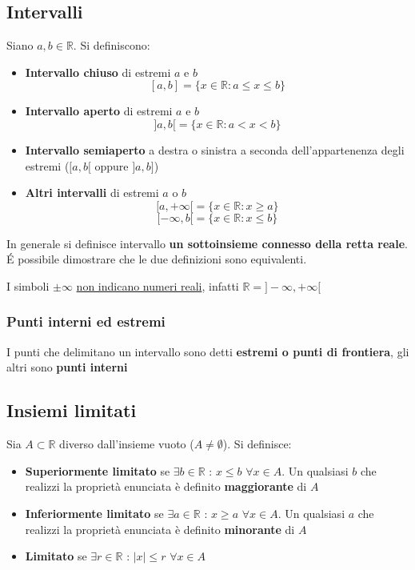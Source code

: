 \documentclass[10pt]{article}
\theoremstyle{plain}
\begin{document}
\subsection{Intervalli}
\begin{defin}
    Siano $a, b \in \mathbb{R}$. Si definiscono:
    \begin{itemize}[label = $\circ$]
        \item \textbf{Intervallo chiuso} di estremi $a$ e $b$
        \[[a,b] = \{x \in \mathbb{R} : a \leq x \leq b\}\]
        \item \textbf{Intervallo aperto} di estremi $a$ e $b$
        \[]a,b[ = \{x \in \mathbb{R} : a < x < b\}\]
        \item \textbf{Intervallo semiaperto} a destra o sinistra a seconda dell'appartenenza degli estremi ($[a,b[$ oppure $]a,b]$)
        \item \textbf{Altri intervalli} di estremi $a$ o $b$
        \[[a,+\infty[ = \{x \in \mathbb{R} : x \geq a\}\]
        \[[-\infty, b[ = \{x \in \mathbb{R} : x \leq b\}\]
    \end{itemize}
    In generale si definisce intervallo \textbf{un sottoinsieme connesso della retta reale}. \'E possibile dimostrare che le due definizioni sono equivalenti.
\end{defin}
\begin{oss}
    I simboli $\pm \infty$ \underline{non indicano numeri reali}, infatti $\mathbb{R} = ]-\infty, + \infty[$
\end{oss}

\subsubsection{Punti interni ed estremi}
\begin{defin}
    I punti che delimitano un intervallo sono detti \textbf{estremi o punti di frontiera}, gli altri sono \textbf{punti interni}
\end{defin}

\subsection{Insiemi limitati}
\begin{defin}
    Sia $A \subset \mathbb{R}$ diverso dall'insieme vuoto ($A \neq \emptyset$). Si definisce:
    \begin{itemize}
        \item \textbf{Superiormente limitato} se $\exists b \in \mathbb{R}$ : $x \leq b$ $\forall x \in A$. Un qualsiasi $b$ che realizzi la proprietà enunciata è definito \textbf{maggiorante} di $A$
        \item \textbf{Inferiormente limitato} se $\exists a \in \mathbb{R}$ : $x \geq a$ $\forall x \in A$. Un qualsiasi $a$ che realizzi la proprietà enunciata è definito \textbf{minorante} di $A$
        \item \textbf{Limitato} se $\exists r \in \mathbb{R}$ : $|x| \leq r$ $\forall x \in A$
    \end{itemize}
\end{defin}
\end{document}
